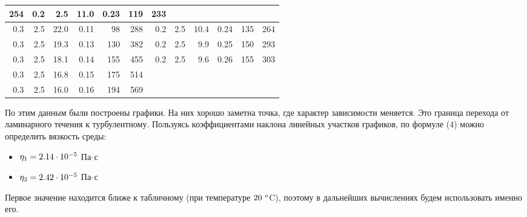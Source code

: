 \begin{table}[H]
{\begin{tabular}{|rrrrrr||rrrrrr|}
  254 &
  \multicolumn{1}{r|}{0.2} &
  \multicolumn{1}{r|}{2.5} &
  \multicolumn{1}{r|}{11.0} &
  \multicolumn{1}{r|}{0.23} &
  \multicolumn{1}{r|}{119} &
  233 \\ \hline
\multicolumn{1}{|r|}{0.3} &
  \multicolumn{1}{r|}{2.5} &
  \multicolumn{1}{r|}{22.0} &
  \multicolumn{1}{r|}{0.11} &
  \multicolumn{1}{r|}{98} &
  288 &
  \multicolumn{1}{r|}{0.2} &
  \multicolumn{1}{r|}{2.5} &
  \multicolumn{1}{r|}{10.4} &
  \multicolumn{1}{r|}{0.24} &
  \multicolumn{1}{r|}{135} &
  264 \\ \hline
\multicolumn{1}{|r|}{0.3} &
  \multicolumn{1}{r|}{2.5} &
  \multicolumn{1}{r|}{19.3} &
  \multicolumn{1}{r|}{0.13} &
  \multicolumn{1}{r|}{130} &
  382 &
  \multicolumn{1}{r|}{0.2} &
  \multicolumn{1}{r|}{2.5} &
  \multicolumn{1}{r|}{9.9} &
  \multicolumn{1}{r|}{0.25} &
  \multicolumn{1}{r|}{150} &
  293 \\ \hline
\multicolumn{1}{|r|}{0.3} &
  \multicolumn{1}{r|}{2.5} &
  \multicolumn{1}{r|}{18.1} &
  \multicolumn{1}{r|}{0.14} &
  \multicolumn{1}{r|}{155} &
  455 &
  \multicolumn{1}{r|}{0.2} &
  \multicolumn{1}{r|}{2.5} &
  \multicolumn{1}{r|}{9.6} &
  \multicolumn{1}{r|}{0.26} &
  \multicolumn{1}{r|}{155} &
  303 \\ \hline
\multicolumn{1}{|r|}{0.3} &
  \multicolumn{1}{r|}{2.5} &
  \multicolumn{1}{r|}{16.8} &
  \multicolumn{1}{r|}{0.15} &
  \multicolumn{1}{r|}{175} &
  514 &
  \multicolumn{6}{r|}{\multirow{2}{*}{}} \\ \cline{1-6}
\multicolumn{1}{|r|}{0.3} &
  \multicolumn{1}{r|}{2.5} &
  \multicolumn{1}{r|}{16.0} &
  \multicolumn{1}{r|}{0.16} &
  \multicolumn{1}{r|}{194} &
  569 &
  \multicolumn{6}{r|}{} \\ \hline
\end{tabular}
}
\end{table}
	По этим данным были построены графики. На них хорошо заметна точка, где характер зависимости меняется. Это граница перехода от ламинарного течения к турбулентному.\n\n
	Пользуясь коэффициентами наклона линейных участков графиков, по формуле (4) можно определить вязкость среды:
	\begin{itemize}
	\item $\eta_{1} = 2.14 \cdot 10^{-5}$ Па$\cdot$с
	\item $\eta_{2} = 2.42 \cdot 10^{-5}$ Па$\cdot$с
	\end{itemize}
	Первое значение находится ближе к табличному (при температуре $20 \text{ } ^o$C), поэтому в дальнейших вычислениях будем использовать именно его.\n\n
